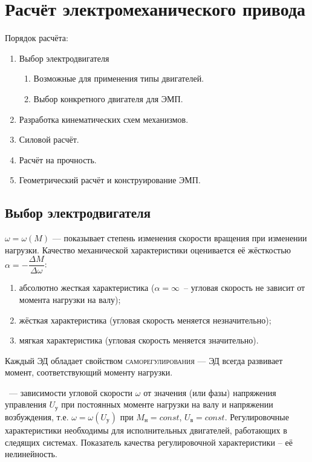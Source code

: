 
\chapter{Расчёт электромеханического привода}
\label{ch:EMP}

Порядок расчёта:
\begin{enumerate}
	\item Выбор электродвигателя
	\begin{enumerate}
		\item Возможные для применения типы двигателей.
		\item Выбор конкретного двигателя для ЭМП.
	\end{enumerate}
	\item Разработка кинематических схем механизмов.
	\item Силовой расчёт.
	\item Расчёт на прочность.
	\item Геометрический расчёт и конструирование ЭМП.
\end{enumerate}

\section{Выбор электродвигателя}

 $ \omega = \omega (M) $ --- показывает степень изменения скорости вращения при изменении нагрузки.
Качество механической характеристики оценивается её жёсткостью $ \alpha = - \dfrac{\Delta M}{\Delta \omega} $:
\begin{enumerate}
	\item абсолютно жесткая характеристика ($ \alpha = \infty $~-- угловая скорость не зависит от момента нагрузки на валу);
	\item жёсткая характеристика (угловая скорость меняется незначительно);
	\item мягкая характеристика (угловая скорость меняется значительно).
\end{enumerate}

\noindent
Каждый ЭД обладает свойством \textsc{саморегулирования} --- ЭД всегда развивает момент, соответствующий моменту нагрузки.

~--- зависимости угловой скорости $ \omega $ от значения (или фазы) напряжения управления $ U_\text{у} $ при постоянных моменте нагрузки на валу и напряжении возбуждения, т.е. $ \omega = \omega (U_\text{у}) $ при $ M_\text{н} = const $, $ U_\text{в} = const $. Регулировочные характеристики необходимы для исполнительных двигателей, работающих в следящих системах. Показатель качества регулировочной характеристики -- её нелинейность.

